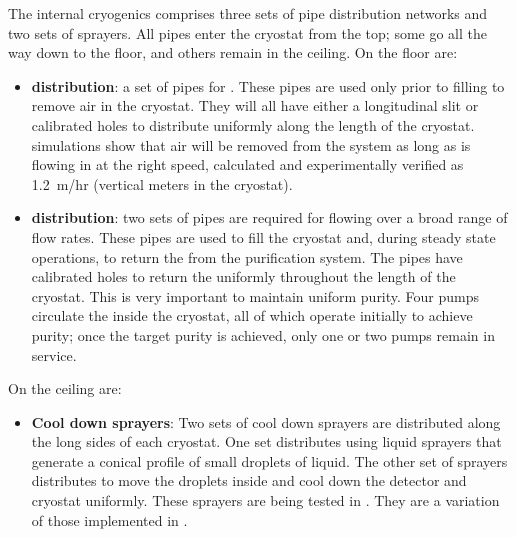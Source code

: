 \label{sec:fdsp-tc-internal-cryo}

The internal cryogenics comprises three sets of pipe distribution networks and two sets of sprayers. All pipes enter the cryostat from the top; some go all the way down to the floor, and others remain in the ceiling. On the floor are:
\begin{itemize}
\setlength\itemsep{1mm}
\setlength{\parsep}{1mm}
\setlength{\itemsep}{-5mm}
\item \textbf{ distribution}: a set of pipes %
for . These pipes are used only prior to filling %
to remove air %
in the cryostat. They will all have either a longitudinal slit or calibrated holes to distribute  uniformly along the length of the cryostat. 
 simulations show that air will be removed from the system as long as  is flowing in at the right speed, calculated and experimentally verified as \SI{1.2}{m/hr} (vertical meters in the cryostat).  


\item \textbf{ distribution}: two sets of pipes are required for flowing 
 over a broad  range of flow rates. These pipes are used to fill the cryostat and, during steady state operations, to return the  from the purification system. The pipes have calibrated holes to return the  uniformly throughout the length of the cryostat. This is very important %
to maintain uniform purity. Four pumps circulate the  inside the cryostat, all of which operate %
initially to achieve purity; %
once the target purity is achieved, only one or two pumps remain in service. %
\end{itemize}

On the ceiling are:

\begin{itemize}
\setlength\itemsep{1mm}
\setlength{\parsep}{1mm}
\setlength{\itemsep}{-5mm}
\item \textbf{Cool down sprayers}: Two sets of cool down sprayers are distributed along the long sides of each cryostat. One set distributes  using liquid sprayers that generate a conical profile of small droplets of liquid. The other set of sprayers distributes  to move the  droplets inside and cool down the detector and cryostat uniformly. These sprayers are being tested in . They are a variation of those implemented in .
\end{itemize}

